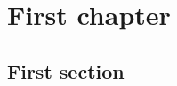 \documentclass[twoside]{report}
\begin{document}
\chapter{First chapter}
\section{First section}
\blindtext
\clearpage
\Blindtext
\end{document}
